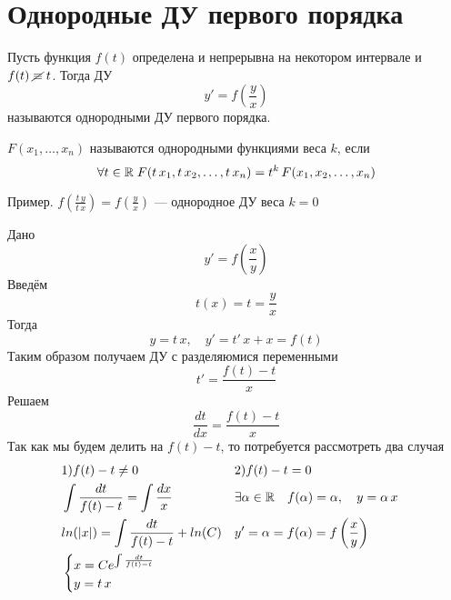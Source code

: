 \author{Tkachuk Andrei}

\section{Однородные ДУ первого порядка}

\begin{Def}
    Пусть функция $f(t)$ определена и непрерывна на некотором интервале и $f(t)\; \cancel{\equiv}\; t$. Тогда ДУ 
    \[
        y' = f\left(\frac{y}{x}\right)
    \]
    называются однородными ДУ первого порядка.
\end{Def}

\begin{Note}
    $F(x_1, \dots, x_n)$ называются однородными функциями веса $k$, если \[
        \forall t \in \mathbb{R} \; F(t\,x_1, t\,x_2, \dots, t\,x_n) = t^k\,F(x_1, x_2, \dots, x_n)
    \]
    
    Пример. $f(\frac{t\,y}{t\,x}) = f(\frac{y}{x})$ --- однородное ДУ веса $k = 0$
\end{Note}
\begin{Note} 
    Дано 
    \[
        y' = f\left(\frac{x}{y}\right)
    \]
    Введём 
    \[
        t(x) = t = \frac{y}{x}
    \]
    Тогда
    \[
        y = t\,x, \quad y' = t'\,x + x = f(t)
    \]
    Таким образом получаем ДУ с разделяюмися переменными
    \[
        t' = \frac{f(t) - t}{x}
    \]
    Решаем
    \[
        \frac{dt}{dx} = \frac{f(t) - t}{x}
    \]
    Так как мы будем делить на $f(t) - t$, то потребуется рассмотреть два случая
    \begin{align*}
        &1) f(t) - t \neq 0& &2) f(t) - t = 0&\\
        &\int\frac{dt}{f(t) - t} = \int \frac{dx}{x}& &\exists\alpha \in \mathbb{R} \quad f(\alpha) = \alpha, \quad y = \alpha\,x&\\
        &ln(|x|) = \int \frac{dt}{f(t) - t} + ln(C)& &y'=\alpha= f(\alpha) = f\left(\frac{x}{y}\right)&\\
        &\begin{cases}
            x = Ce^{\int \frac{dt}{f(t) - t}}\\
            y = t\,x
        \end{cases}&
    \end{align*}
\end{Note}


